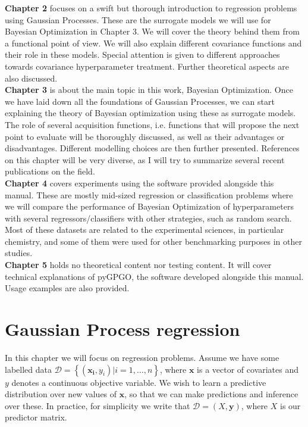 \documentclass[10pt,a4paper,twoside]{book}
\begin{document}
\textbf{Chapter 2} focuses on a swift but thorough introduction to regression problems using Gaussian Processes. These are the surrogate models we will use for Bayesian Optimization in Chapter 3. We will cover the theory behind them from a functional point of view. We will also explain different covariance functions and their role in these models. Special attention is given to different approaches towards covariance hyperparameter treatment. Further theoretical aspects are also discussed.\\

\textbf{Chapter 3} is about the main topic in this work, Bayesian Optimization. Once we have laid down all the foundations of Gaussian Processes, we can start explaining the theory of Bayesian optimization using these as surrogate models. The role of several acquisition functions, i.e. functions that will propose the next point to evaluate will be thoroughly discussed, as well as their advantages or disadvantages. Different modelling choices are then further presented. References on this chapter will be very diverse, as I will try to summarize several recent publications on the field.  \\

\textbf{Chapter 4} covers experiments using the software provided alongside this manual. These are mostly mid-sized regression or classification problems where we will compare the performance of Bayesian Optimization of hyperparameters with several regressors/classifiers with other strategies, such as random search. Most of these datasets are related to the experimental sciences, in particular chemistry, and some of them were used for other benchmarking purposes in other studies. \\

\textbf{Chapter 5} holds no theoretical content nor testing content. It will cover technical explanations of pyGPGO, the software developed alongside this manual. Usage examples are also provided. 

\chapter{Gaussian Process regression}

 In this chapter we will focus on regression problems. Assume we have some labelled data $\mathcal{D} = \left\lbrace \left(\boldsymbol{x_i}, y_i\right) | i = 1,\dots,n\right\rbrace$, where $\boldsymbol{x}$ is a vector of covariates and $y$ denotes a continuous objective variable. We wish to learn a predictive distribution over new values of $\boldsymbol{x}$, so that we can make predictions and inference over these. In practice, for simplicity we write that $\mathcal{D} = \left(X, \boldsymbol{y}\right)$, where $X$ is our predictor matrix.\\
\end{document}
